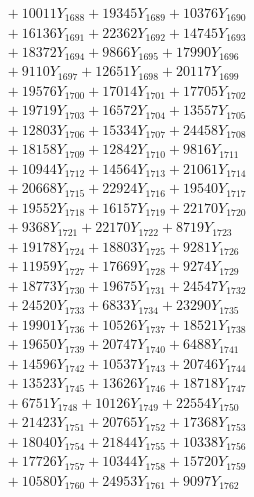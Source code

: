 \documentclass[a4paper,10pt]{article}
\begin{document}
{\begin{align}
&\;  + 10011 Y_{1688} + 19345 Y_{1689} + 10376 Y_{1690} \\[0.3ex]
&\;  + 16136 Y_{1691} + 22362 Y_{1692} + 14745 Y_{1693} \\[0.3ex]
&\;  + 18372 Y_{1694} + 9866 Y_{1695} + 17990 Y_{1696} \\[0.3ex]
&\;  + 9110 Y_{1697} + 12651 Y_{1698} + 20117 Y_{1699} \\[0.3ex]
&\;  + 19576 Y_{1700} + 17014 Y_{1701} + 17705 Y_{1702} \\[0.3ex]
&\;  + 19719 Y_{1703} + 16572 Y_{1704} + 13557 Y_{1705} \\[0.3ex]
&\;  + 12803 Y_{1706} + 15334 Y_{1707} + 24458 Y_{1708} \\[0.5ex]\allowbreak
&\;  + 18158 Y_{1709} + 12842 Y_{1710} + 9816 Y_{1711} \\[0.3ex]
&\;  + 10944 Y_{1712} + 14564 Y_{1713} + 21061 Y_{1714} \\[0.3ex]
&\;  + 20668 Y_{1715} + 22924 Y_{1716} + 19540 Y_{1717} \\[0.3ex]
&\;  + 19552 Y_{1718} + 16157 Y_{1719} + 22170 Y_{1720} \\[0.3ex]
&\;  + 9368 Y_{1721} + 22170 Y_{1722} + 8719 Y_{1723} \\[0.3ex]
&\;  + 19178 Y_{1724} + 18803 Y_{1725} + 9281 Y_{1726} \\[0.3ex]
&\;  + 11959 Y_{1727} + 17669 Y_{1728} + 9274 Y_{1729} \\[0.3ex]
&\;  + 18773 Y_{1730} + 19675 Y_{1731} + 24547 Y_{1732} \\[0.3ex]
&\;  + 24520 Y_{1733} + 6833 Y_{1734} + 23290 Y_{1735} \\[0.3ex]
&\;  + 19901 Y_{1736} + 10526 Y_{1737} + 18521 Y_{1738} \\[0.5ex]\allowbreak
&\;  + 19650 Y_{1739} + 20747 Y_{1740} + 6488 Y_{1741} \\[0.3ex]
&\;  + 14596 Y_{1742} + 10537 Y_{1743} + 20746 Y_{1744} \\[0.3ex]
&\;  + 13523 Y_{1745} + 13626 Y_{1746} + 18718 Y_{1747} \\[0.3ex]
&\;  + 6751 Y_{1748} + 10126 Y_{1749} + 22554 Y_{1750} \\[0.3ex]
&\;  + 21423 Y_{1751} + 20765 Y_{1752} + 17368 Y_{1753} \\[0.3ex]
&\;  + 18040 Y_{1754} + 21844 Y_{1755} + 10338 Y_{1756} \\[0.3ex]
&\;  + 17726 Y_{1757} + 10344 Y_{1758} + 15720 Y_{1759} \\[0.3ex]
&\;  + 10580 Y_{1760} + 24953 Y_{1761} + 9097 Y_{1762} \\[0.3ex]

\end{align}}
\end{document}
